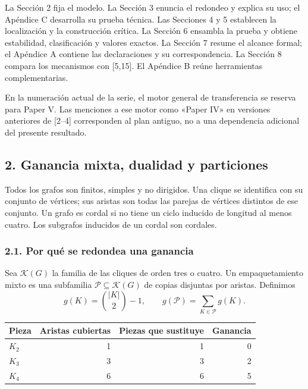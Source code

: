 \documentclass[spanish,11pt,a4paper]{article}
\newcounter{none}
\begin{document}
La Sección 2 fija el modelo. La Sección 3 enuncia el redondeo y explica su uso; el Apéndice C desarrolla su prueba técnica. Las Secciones 4 y 5 establecen la localización y la construcción crítica. La Sección 6 ensambla la prueba y obtiene estabilidad, clasificación y valores exactos. La Sección 7 resume el alcance formal; el Apéndice A contiene las declaraciones y su correspondencia. La Sección 8 compara los mecanismos con {[}5,15{]}. El Apéndice B reúne herramientas complementarias.

En la numeración actual de la serie, el motor general de transferencia se reserva para Paper V. Las menciones a ese motor como «Paper IV» en versiones anteriores de {[}2--4{]} corresponden al plan antiguo, no a una dependencia adicional del presente resultado.

\subsection{2. Ganancia mixta, dualidad y particiones}\label{ganancia-mixta-dualidad-y-particiones}

Todos los grafos son finitos, simples y no dirigidos. Una clique se identifica con su conjunto de vértices; sus aristas son todas las parejas de vértices distintos de ese conjunto. Un grafo es cordal si no tiene un ciclo inducido de longitud al menos cuatro. Los subgrafos inducidos de un cordal son cordales.

\subsubsection{2.1. Por qué se redondea una ganancia}\label{por-que-se-redondea-una-ganancia}

Sea \(\mathcal K(G)\) la familia de las cliques de orden tres o cuatro. Un empaquetamiento mixto es una subfamilia \(\mathcal P\subseteq\mathcal K(G)\) de copias disjuntas por aristas. Definimos \[
g(K)=\binom{|K|}{2}-1,\qquad
g(\mathcal P)=\sum_{K\in\mathcal P}g(K).
\]


{\def\LTcaptype{none} %
\begin{longtable}[c]{@{}lrrr@{}}
\toprule\noalign{}
Pieza & Aristas cubiertas & Piezas que sustituye & Ganancia \\
\midrule\noalign{}
\endhead
\bottomrule\noalign{}
\endlastfoot
\(K_2\) & 1 & 1 & 0 \\
\(K_3\) & 3 & 3 & 2 \\
\(K_4\) & 6 & 6 & 5 \\
\end{longtable}
}
\end{document}
